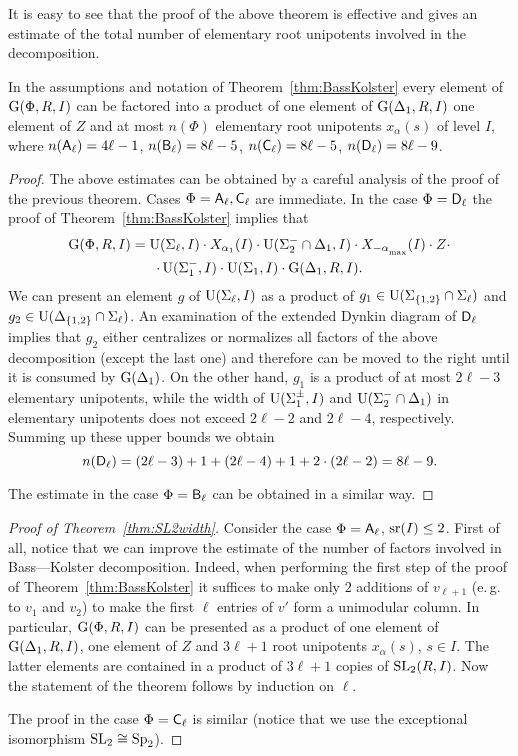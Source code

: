 It is easy to see that the proof of the above theorem is effective and gives an estimate of the total number of elementary root unipotents involved in the decomposition.
\begin{cor}
In the assumptions and notation of Theorem~\ref{thm:BassKolster} every element of $\operatorname{G}(\Phi,R,I)$ 
can be factored into a product of one element of $\operatorname{G}(\Delta_1,R,I)$ one element of $Z$ and at most $n(\Phi)$ elementary root unipotents $x_\alpha(s)$ of level $I$, where
$n(\mathsf{A}_\ell)= 4 \ell - 1$, $n(\mathsf{B}_\ell)= 8 \ell - 5$, $n(\mathsf{C}_\ell)= 8 \ell - 5$, $n(\mathsf{D}_\ell)= 8 \ell - 9$. \end{cor}
\begin{proof}
The above estimates can be obtained by a careful analysis of the proof of the previous theorem.
Cases $\Phi=\mathsf{A}_\ell, \mathsf{C}_\ell$ are immediate.
In the case $\Phi=\mathsf{D}_\ell$ the proof of Theorem~\ref{thm:BassKolster} implies that
\begin{multline}\nonumber
\G(\Phi,R,I) =  \U(\Sigma_\ell,I) \cdot X_{\alpha_1}(I) \cdot \U(\Sigma_2^-\cap\Delta_1,I) \cdot X_{-\alpha\ssub{\mathrm{max}}}(I) \cdot Z  \cdot \\ \cdot \U(\Sigma_1^-,I) \cdot \U(\Sigma_1,I) \cdot \G(\Delta_1,R,I).
\end{multline}
We can present an element $g$ of $\operatorname{U}(\Sigma_\ell, I)$ as a product of $g_1 \in \operatorname{U}(\Sigma_{\{1,2\}} \cap \Sigma_\ell)$ and $g_2\in \operatorname{U}(\Delta_{\{1,2\}}\cap \Sigma_\ell)$.
An examination of the extended Dynkin diagram of $\mathsf{D}_\ell$ implies that $g_2$ either centralizes or normalizes all factors of the above decomposition (except the last one) and therefore can be moved to the right until it is consumed by $\operatorname{G}(\Delta_1)$.
On the other hand, $g_1$ is a product of at most $2\ell-3$ elementary unipotents, while the width of $\operatorname{U}(\Sigma_1^\pm, I)$ and $\operatorname{U}(\Sigma_2^-\cap\Delta_1)$ in elementary unipotents does not exceed $2\ell-2$ and $2\ell-4$, respectively.
Summing up these upper bounds we obtain
$$n(\mathsf{D}_\ell) = (2\ell-3) + 1 + (2\ell - 4) + 1 + 2\cdot (2\ell - 2) = 8\ell - 9.$$

The estimate in the case $\Phi=\mathsf{B}_\ell$ can be obtained in a similar way. \end{proof}

\begin{proof}[Proof of Theorem~\ref{thm:SL2width}]
Consider the case $\Phi=\mathsf{A}_\ell$, $\operatorname{sr}(I)\leq 2$. First of all, notice that we can improve the estimate of the number of factors involved in Bass---Kolster decomposition.
Indeed, when performing the first step of the proof of Theorem~\ref{thm:BassKolster} it suffices to make only $2$ additions of $v_{\ell+1}$ (e.\,g. to $v_{1}$ and $v_2$) to make the first $\ell$ entries of $v'$ form a unimodular column.
In particular, $\operatorname{G}(\Phi, R, I)$ can be presented as a product of one element of $\operatorname{G}(\Delta_1, R, I)$, one element of $Z$ and $3\ell+1$ root unipotents $x_\alpha(s)$, $s\in I$.
The latter elements are contained in a product of $3\ell + 1$ copies of $\operatorname{SL}_2(R, I)$. Now the statement of the theorem follows by induction on $\ell$.

The proof in the case $\Phi=\mathsf{C}_\ell$ is similar (notice that we use the exceptional isomorphism $\operatorname{SL}_2\cong \operatorname{Sp}_2$).
\end{proof}
